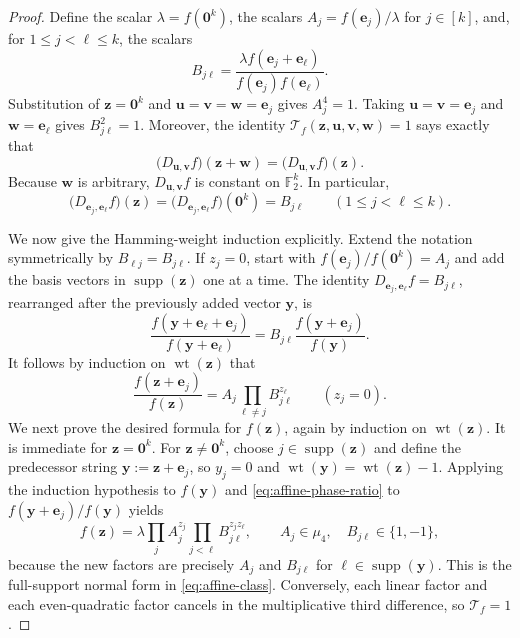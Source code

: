 \documentclass[11pt,letterpaper,onecolumn]{article}
\theoremstyle{plain}
\theoremstyle{definition}
\theoremstyle{remark}
\newcommand{\Ftwo}{\mathbb F_2}
\newcommand{\wt}{\operatorname{wt}}
\newcommand{\supp}{\operatorname{supp}}
\newcommand{\zero}{\mathbf 0}
\begin{document}
\begin{proof}
Define the scalar \(\lambda=f(\zero^k)\), the scalars
\(A_j=f({\mathbf{e}}_j)/\lambda\) for \(j\in[k]\), and, for
\(1\le j<\ell\le k\), the scalars
\[
 B_{j\ell}=\frac{\lambda f({\mathbf{e}}_j+{\mathbf{e}}_\ell)}{f({\mathbf{e}}_j)f({\mathbf{e}}_\ell)}.
\]
Substitution of \({\mathbf{z}}=\zero^k\) and \({\mathbf{u}}={\mathbf{v}}={\mathbf{w}}={\mathbf{e}}_j\) gives \(A_j^4=1\). Taking
\({\mathbf{u}}={\mathbf{v}}={\mathbf{e}}_j\) and \({\mathbf{w}}={\mathbf{e}}_\ell\) gives \(B_{j\ell}^2=1\).  Moreover, the identity
\(\mathcal T_f({\mathbf{z}},{\mathbf{u}},{\mathbf{v}},{\mathbf{w}})=1\) says exactly that
\[
 \bigl(D_{{\mathbf{u}},{\mathbf{v}}}f\bigr)({\mathbf{z}}+{\mathbf{w}})=\bigl(D_{{\mathbf{u}},{\mathbf{v}}}f\bigr)({\mathbf{z}}).
\]
Because \({\mathbf{w}}\) is arbitrary, \(D_{{\mathbf{u}},{\mathbf{v}}}f\) is constant on \(\Ftwo^k\).
In particular,
\[
 \bigl(D_{{\mathbf{e}}_j,{\mathbf{e}}_\ell}f\bigr)({\mathbf{z}})=
 \bigl(D_{{\mathbf{e}}_j,{\mathbf{e}}_\ell}f\bigr)(\zero^k)=B_{j\ell}
 \qquad(1\le j<\ell\le k).
\]

We now give the Hamming-weight induction explicitly.  Extend the notation
symmetrically by \(B_{\ell j}=B_{j\ell}\).  If \(z_j=0\), start with
\(f({\mathbf{e}}_j)/f(\zero^k)=A_j\) and add the basis vectors in \(\supp({\mathbf{z}})\) one at a
time.  The identity \(D_{{\mathbf{e}}_j,{\mathbf{e}}_\ell}f=B_{j\ell}\), rearranged after the
previously added vector \({\mathbf{y}}\), is
\[
 \frac{f({\mathbf{y}}+{\mathbf{e}}_\ell+{\mathbf{e}}_j)}{f({\mathbf{y}}+{\mathbf{e}}_\ell)}
 =
 B_{j\ell}\frac{f({\mathbf{y}}+{\mathbf{e}}_j)}{f({\mathbf{y}})}.
\]
It follows by induction on \(\wt({\mathbf{z}})\) that
\begin{equation}
 \frac{f({\mathbf{z}}+{\mathbf{e}}_j)}{f({\mathbf{z}})}
 =A_j\prod_{\ell\ne j}B_{j\ell}^{z_\ell}
 \qquad(z_j=0).
 \label{eq:affine-phase-ratio}
\end{equation}
We next prove the desired formula for \(f({\mathbf{z}})\), again by induction on
\(\wt({\mathbf{z}})\).  It is immediate for \({\mathbf{z}}=\zero^k\).  For
\({\mathbf{z}}\ne\zero^k\), choose
\(j\in\supp({\mathbf{z}})\) and define the predecessor string \({\mathbf{y}}:={\mathbf{z}}+{\mathbf{e}}_j\), so \(y_j=0\) and
\(\wt({\mathbf{y}})=\wt({\mathbf{z}})-1\).  Applying the induction hypothesis to \(f({\mathbf{y}})\) and
\cref{eq:affine-phase-ratio} to \(f({\mathbf{y}}+{\mathbf{e}}_j)/f({\mathbf{y}})\) yields
\[
 f({\mathbf{z}})=\lambda\prod_jA_j^{z_j}\prod_{j<\ell}B_{j\ell}^{z_jz_\ell},
 \qquad A_j\in\mu_4,\quad B_{j\ell}\in\{1,-1\},
\]
because the new factors are precisely \(A_j\) and
\(B_{j\ell}\) for \(\ell\in\supp({\mathbf{y}})\).  This is the full-support normal form in
\cref{eq:affine-class}.  Conversely, each linear factor and each
even-quadratic factor cancels in the multiplicative third difference, so
\(\mathcal T_f=1\).
\end{proof}
\end{document}
